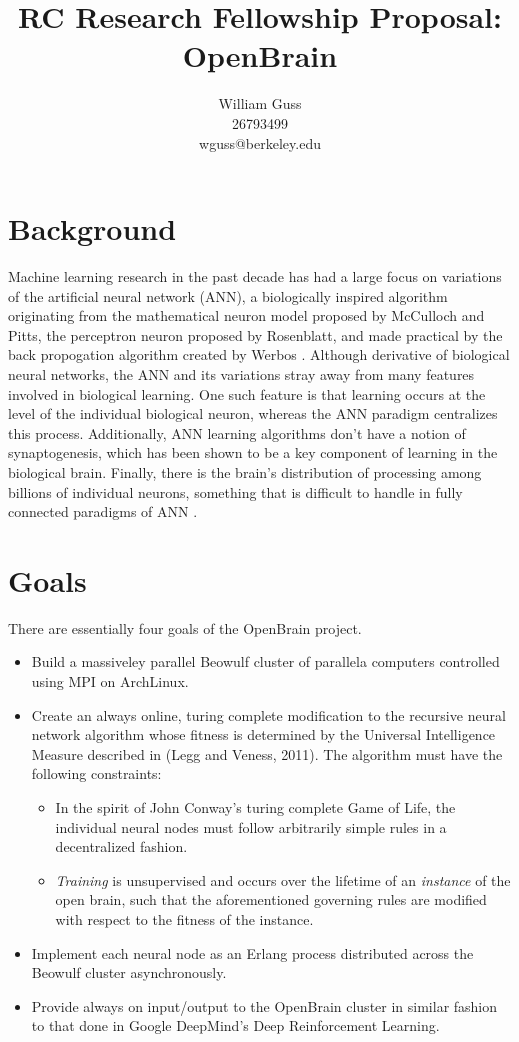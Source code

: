 \documentclass[letter]{article}
\title{RC Research Fellowship Proposal: OpenBrain}
\author{William Guss\\26793499\\wguss@berkeley.edu}
\begin{document}
\maketitle
\thispagestyle{empty}


\section{Background}
Machine learning research in the past decade has had a large focus on variations of the artificial neural network (ANN),
a biologically inspired algorithm originating from the mathematical neuron model proposed by McCulloch and Pitts\cite{mcpitts},
the perceptron neuron proposed by Rosenblatt\cite{perceptron}, and made practical by the back propogation algorithm created by Werbos \cite{bprop}.
Although derivative of biological neural networks, the ANN and its variations stray away from many features involved in biological learning. One
such feature is that learning occurs at the level of the individual biological neuron, whereas the ANN paradigm centralizes this process.
Additionally, ANN learning algorithms don't have a notion of synaptogenesis, which has been shown to be a key component of learning in the biological
brain\cite{gene}. Finally, there is the brain's distribution of processing among billions of individual neurons, something that is difficult to handle
in fully connected paradigms of ANN \cite{annbook}.

\section{Goals}
There are essentially four goals of the OpenBrain project.
\begin{itemize}
\item Build a massiveley parallel Beowulf cluster of parallela computers controlled using MPI on ArchLinux.
\item Create an always online, turing complete modification to the recursive neural network algorithm whose fitness
is determined by the Universal Intelligence Measure described in (Legg and Veness, 2011). The algorithm must have the
following constraints:
    \begin{itemize}
        \item In the spirit of John Conway's turing complete Game of Life, the individual neural nodes must follow
         arbitrarily simple rules in a decentralized fashion.
        \item \emph{Training} is unsupervised and occurs over the lifetime of an \emph{instance} of the open brain,
        such that the aforementioned governing rules are modified with respect to the fitness of the instance.
    \end{itemize}
\item Implement each neural node as an Erlang process distributed across the Beowulf cluster asynchronously.
\item Provide always on input/output to the OpenBrain cluster in similar fashion to that done in Google DeepMind's
  Deep Reinforcement Learning.
\end{itemize}
\end{document}
